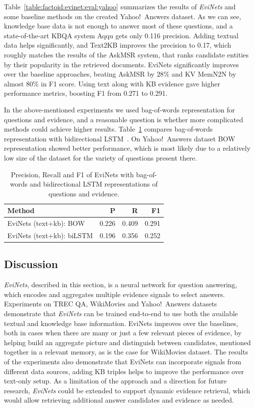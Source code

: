 Table~\ref{table:factoid:evinet:eval:yahoo} summarizes the results of \textit{EviNets} and some baseline methods on the created Yahoo!~Answers dataset.
As we can see, knowledge base data is not enough to answer most of these questions, and a state-of-the-art KBQA system Aqqu gets only 0.116 precision.
Adding textual data helps significantly, and Text2KB improves the precision to 0.17, which roughly matches the results of the AskMSR system, that ranks candidate entities by their popularity in the retrieved documents.
EviNets significantly improves over the baseline approaches, beating AskMSR by $28\%$ and KV MemN2N by almost $80\%$ in F1 score.
Using text along with KB evidence gave higher performance metrics, boosting F1 from 0.271 to 0.291.

In the above-mentioned experiments we used bag-of-words representation for questions and evidence, and a reasonable question is whether more complicated methods could achieve higher results.
Table~\ref{table:factoid:evinet:eval:yahoo_bilstm} compares bag-of-words representation with bidirectional LSTM~\cite{WangN15}.
On Yahoo!~Answers dataset BOW representation showed better performance, which is most likely due to a relatively low size of the dataset for the variety of questions present there.

\begin{table}
\centering
\begin{tabular}{lrrr}
Method & P & R & F1 \\
\hline
EviNets (text+kb): BOW & 0.226 & 0.409 & 0.291 \\
EviNets (text+kb): biLSTM & 0.196 & 0.356 & 0.252 \\
\end{tabular}
\caption{Precision, Recall and F1 of EviNets with bag-of-words and bidirectional LSTM representations of questions and evidence.}
\label{table:factoid:evinet:eval:yahoo_bilstm}
\end{table}


\subsection{Discussion}
\label{section:factoid:evinet:discussion}

\textit{EviNets}, described in this section, is a neural network for question answering, which encodes and aggregates multiple evidence signals to select answers.
Experiments on TREC QA, WikiMovies and Yahoo!~Answers datasets demonstrate that \textit{EviNets} can be trained end-to-end to use both the available textual and knowledge base information.
EviNets improves over the baselines, both in cases when there are many or just a few relevant pieces of evidence, by helping build an aggregate picture and distinguish between candidates, mentioned together in a relevant memory, as is the case for WikiMovies dataset.
The results of the experiments also demonstrate that EviNets can incorporate signals from different data sources, \eg adding KB triples helps to improve the performance over text-only setup.
As a limitation of the approach and a direction for future research, \textit{EviNets} could be extended to support dynamic evidence retrieval, which would allow retrieving additional answer candidates and evidence as needed.

